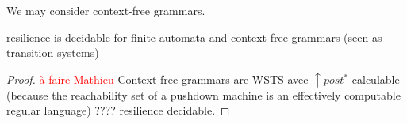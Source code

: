 We may consider context-free grammars.

\begin{corollary}
{\sc resilience} is decidable for finite automata and context-free grammars (seen as transition systems)
\end{corollary}

\begin{proof}

  \textcolor{red}{à faire Mathieu}
Context-free grammars are WSTS \cite{DBLP:journals/tcs/FinkelS01} avec $\uparrow post^*$ calculable (because the reachability set of a pushdown machine is an effectively computable regular language) ???? resilience decidable.
\end{proof}


\cite{DBLP:journals/ipl/BouajjaniEFMRWW00}


